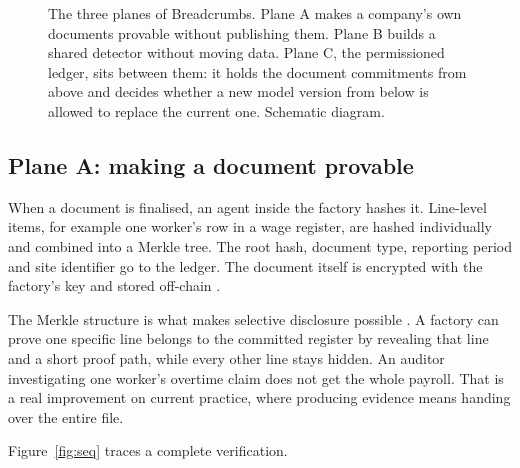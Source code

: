 \documentclass[11pt,a4paper]{article}
\begin{document}
\begin{figure}[htbp]
\caption{The three planes of Breadcrumbs. Plane A makes a company's own documents
provable without publishing them. Plane B builds a shared detector without
moving data. Plane C, the permissioned ledger, sits between them: it holds the
document commitments from above and decides whether a new model version from
below is allowed to replace the current one. Schematic diagram.}
\label{fig:arch}
\end{figure}

\subsection{Plane A: making a document provable}

When a document is finalised, an agent inside the factory hashes it. Line-level
items, for example one worker's row in a wage register, are hashed individually
and combined into a Merkle tree. The root hash, document type, reporting period
and site identifier go to the ledger. The document itself is encrypted with the
factory's key and stored off-chain \citep{benet2014ipfs}.

The Merkle structure is what makes selective disclosure possible
\citep{merkle1988signature}. A factory can prove one specific line belongs to
the committed register by revealing that line and a short proof path, while
every other line stays hidden. An auditor investigating one worker's overtime
claim does not get the whole payroll. That is a real improvement on current
practice, where producing evidence means handing over the entire file.

Figure~\ref{fig:seq} traces a complete verification.
\end{document}
